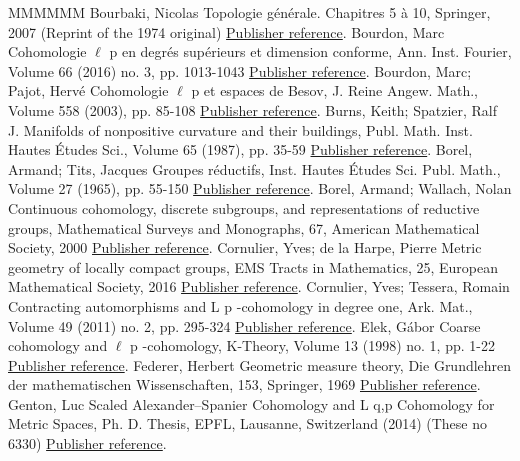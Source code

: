 \documentclass[11pt]{article}
\theoremstyle{definition}
\numberwithin{equation}{section}
\numberwithin{figure}{section}
\numberwithin{table}{section}
\begin{document}
\begin{thebibliography}{MMMMMM}
 Bourbaki, Nicolas Topologie générale. Chapitres 5 à 10, Springer, 2007 (Reprint of the 1974 original) \href{https://ahl.centre-mersenne.org/item/AHL_2020__3__1291_0/#BBK-TG-5to10}{Publisher reference}.
 Bourdon, Marc Cohomologie \(\ell\) p  en degrés supérieurs et dimension conforme, Ann. Inst. Fourier, Volume 66 (2016) no. 3, pp. 1013-1043 \href{https://ahl.centre-mersenne.org/item/AHL_2020__3__1291_0/#B16}{Publisher reference}.
 Bourdon, Marc; Pajot, Hervé Cohomologie \(\ell\) p  et espaces de Besov, J. Reine Angew. Math., Volume 558 (2003), pp. 85-108 \href{https://ahl.centre-mersenne.org/item/AHL_2020__3__1291_0/#BP2}{Publisher reference}.
 Burns, Keith; Spatzier, Ralf J. Manifolds of nonpositive curvature and their buildings, Publ. Math. Inst. Hautes Études Sci., Volume 65 (1987), pp. 35-59 \href{https://ahl.centre-mersenne.org/item/AHL_2020__3__1291_0/#BS}{Publisher reference}.
 Borel, Armand; Tits, Jacques Groupes réductifs, Inst. Hautes Études Sci. Publ. Math., Volume 27 (1965), pp. 55-150 \href{https://ahl.centre-mersenne.org/item/AHL_2020__3__1291_0/#BoTi}{Publisher reference}.
 Borel, Armand; Wallach, Nolan Continuous cohomology, discrete subgroups, and representations of reductive groups, Mathematical Surveys and Monographs, 67, American Mathematical Society, 2000 \href{https://ahl.centre-mersenne.org/item/AHL_2020__3__1291_0/#BW}{Publisher reference}.
 Cornulier, Yves; de la Harpe, Pierre Metric geometry of locally compact groups, EMS Tracts in Mathematics, 25, European Mathematical Society, 2016 \href{https://ahl.centre-mersenne.org/item/AHL_2020__3__1291_0/#CdH}{Publisher reference}.
 Cornulier, Yves; Tessera, Romain Contracting automorphisms and L p -cohomology in degree one, Ark. Mat., Volume 49 (2011) no. 2, pp. 295-324 \href{https://ahl.centre-mersenne.org/item/AHL_2020__3__1291_0/#CT}{Publisher reference}.
 Elek, Gábor Coarse cohomology and \(\ell\) p -cohomology, K-Theory, Volume 13 (1998) no. 1, pp. 1-22 \href{https://ahl.centre-mersenne.org/item/AHL_2020__3__1291_0/#Elek}{Publisher reference}.
 Federer, Herbert Geometric measure theory, Die Grundlehren der mathematischen Wissenschaften, 153, Springer, 1969 \href{https://ahl.centre-mersenne.org/item/AHL_2020__3__1291_0/#Fed}{Publisher reference}.
 Genton, Luc Scaled Alexander–Spanier Cohomology and L q,p  Cohomology for Metric Spaces, Ph. D. Thesis, EPFL, Lausanne, Switzerland (2014) (These no 6330) \href{https://ahl.centre-mersenne.org/item/AHL_2020__3__1291_0/#Genton}{Publisher reference}.

\end{thebibliography}
\end{document}
